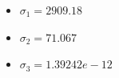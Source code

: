 \begin{itemize}
    \item $\sigma_1 = 2909.18$
    \item $\sigma_2 = 71.067$
    \item $\sigma_3 = 1.39242e-12$
\end{itemize}
